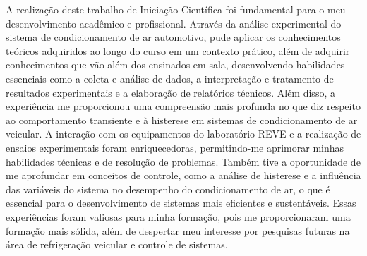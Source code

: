 A realização deste trabalho de Iniciação Científica foi fundamental para o meu desenvolvimento acadêmico e profissional. Através da análise experimental do sistema de condicionamento de ar automotivo, pude aplicar os conhecimentos teóricos adquiridos ao longo do curso em um contexto prático, além de adquirir conhecimentos que vão além dos ensinados em sala, desenvolvendo habilidades essenciais como a coleta e análise de dados, a interpretação e tratamento de resultados experimentais e a elaboração de relatórios técnicos.  Além disso, a experiência me proporcionou uma compreensão mais profunda no que diz respeito ao comportamento transiente e à histerese em sistemas de condicionamento de ar veicular. A interação com os equipamentos do laboratório REVE e a realização de ensaios experimentais foram enriquecedoras, permitindo-me aprimorar minhas habilidades técnicas e de resolução de problemas. Também tive a oportunidade de me aprofundar em conceitos de controle, como a análise de histerese e a influência das variáveis do sistema no desempenho do condicionamento de ar, o que é essencial para o desenvolvimento de sistemas mais eficientes e sustentáveis.
Essas experiências foram valiosas para minha formação, pois me proporcionaram uma formação mais sólida, além de despertar meu interesse por pesquisas futuras na área de refrigeração veicular e controle de sistemas. 
